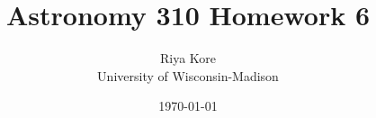 \documentclass[10pt]{article}
\def \MYID{Riya Kore}
\begin{document}
\pagestyle{fancy}
\fancyhf{}
\fancyfoot[C]{\thepage}

\title{Astronomy 310 Homework 6}
\author{\MYID\\
University of Wisconsin-Madison}
\date{\today}
\maketitle
\end{document}
